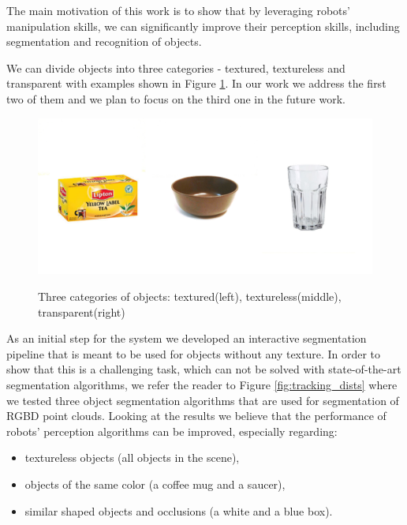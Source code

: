  The main
motivation of this work is to show that by leveraging robots' manipulation skills, we can significantly improve their perception skills, including segmentation and recognition of objects.
	

	
	
We can divide objects into three categories - textured, textureless and transparent with examples shown in Figure \ref{fig:all-objects}. In our work we address the first two of them and we plan to focus on the third one in the future work.

\begin{figure}
\centering

{\includegraphics[width=1\columnwidth]{figures/all-objects.jpg}}

\caption{Three categories of objects: textured(left), textureless(middle), transparent(right)}
\label{fig:all-objects}
\end{figure}

As an initial step for the system we developed an interactive segmentation pipeline that is meant to be used for objects without any texture. In order to show that this is a challenging task, which can not be solved with state-of-the-art segmentation algorithms, we refer the reader to Figure \ref{fig:tracking_dists} where we tested three object segmentation algorithms that are used for segmentation of RGBD point clouds. Looking at the results we believe that the performance of robots' perception algorithms can be improved, especially regarding: 

\begin{itemize} 
\item textureless objects (all objects in the scene),
\item objects of the same color (a coffee mug and a saucer),
\item similar shaped objects and occlusions (a white and a blue box).
\end{itemize}


